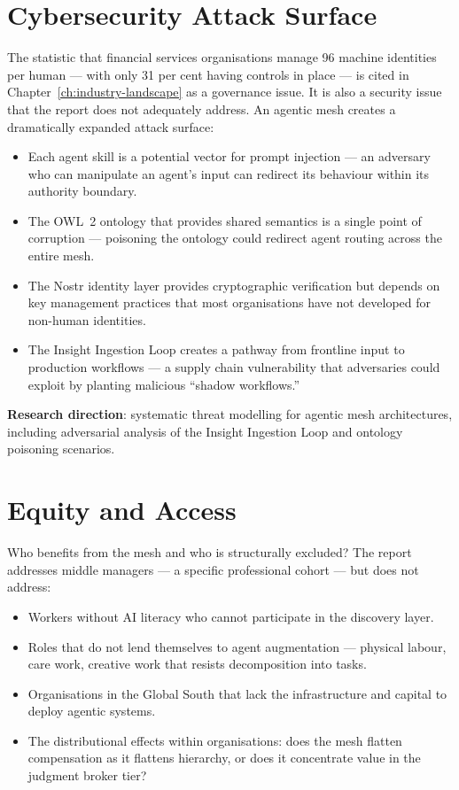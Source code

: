 \section{Cybersecurity Attack Surface}

The statistic that financial services organisations manage 96 machine identities per human \parencite{CyberArk2025} --- with only 31 per cent having controls in place --- is cited in Chapter~\ref{ch:industry-landscape} as a governance issue. It is also a security issue that the report does not adequately address. An agentic mesh creates a dramatically expanded attack surface:

\begin{itemize}
  \item Each agent skill is a potential vector for prompt injection --- an adversary who can manipulate an agent's input can redirect its behaviour within its authority boundary.
  \item The OWL~2 ontology that provides shared semantics is a single point of corruption --- poisoning the ontology could redirect agent routing across the entire mesh.
  \item The Nostr identity layer provides cryptographic verification but depends on key management practices that most organisations have not developed for non-human identities.
  \item The Insight Ingestion Loop creates a pathway from frontline input to production workflows --- a supply chain vulnerability that adversaries could exploit by planting malicious ``shadow workflows.''
\end{itemize}

\textbf{Research direction}: systematic threat modelling for agentic mesh architectures, including adversarial analysis of the Insight Ingestion Loop and ontology poisoning scenarios.

\section{Equity and Access}

Who benefits from the mesh and who is structurally excluded? The report addresses middle managers --- a specific professional cohort --- but does not address:

\begin{itemize}
  \item Workers without AI literacy who cannot participate in the discovery layer.
  \item Roles that do not lend themselves to agent augmentation --- physical labour, care work, creative work that resists decomposition into tasks.
  \item Organisations in the Global South that lack the infrastructure and capital to deploy agentic systems.
  \item The distributional effects within organisations: does the mesh flatten compensation as it flattens hierarchy, or does it concentrate value in the judgment broker tier?
\end{itemize}

